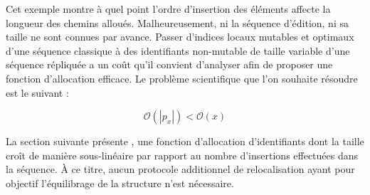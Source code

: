 Cet exemple montre à quel point l'ordre d'insertion des éléments affecte la
longueur des chemins alloués. Malheureusement, ni la séquence d'édition, ni sa
taille ne sont connues par avance.  Passer d'indices locaux mutables et optimaux
d'une séquence classique à des identifiants non-mutable de taille variable d'une
séquence répliquée a un coût qu'il convient d'analyser afin de proposer une
fonction d'allocation efficace. Le problème scientifique que l'on souhaite
résoudre est le suivant :

\begin{problem}
  \begin{equation}
    \mathcal{O}(|p_x|) < \mathcal{O}(x)    
  \end{equation}
\end{problem}

La section suivante présente \LSEQ, une fonction d'allocation d'identifiants
dont la taille croît de manière sous-linéaire par rapport au nombre d'insertions
effectuées dans la séquence. À ce titre, aucun protocole additionnel de
relocalisation ayant pour objectif l'équilibrage de la structure n'est
nécessaire.



